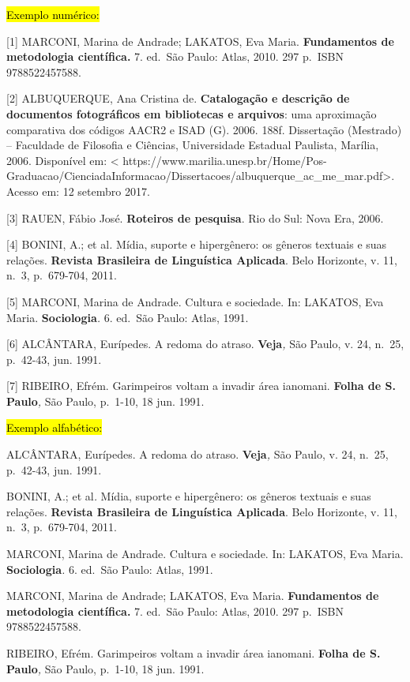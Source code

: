 \documentclass[
]{article}
\begin{document}
\hl{Exemplo numérico:}

{[}1{]} MARCONI, Marina de Andrade; LAKATOS, Eva Maria.
\textbf{Fundamentos de metodologia científica. }7. ed.~São Paulo: Atlas,
2010. 297 p.~ISBN 9788522457588.

{[}2{]} ALBUQUERQUE, Ana Cristina de. \textbf{Catalogação e descrição de
documentos fotográficos em bibliotecas e arquivos}: uma aproximação
comparativa dos códigos AACR2 e ISAD (G). 2006. 188f. Dissertação
(Mestrado) -- Faculdade de Filosofia e Ciências, Universidade Estadual
Paulista, Marília, 2006. Disponível em: \textless{}
https://www.marilia.unesp.br/Home/Pos-Graduacao/CienciadaInformacao/Dissertacoes/albuquerque\_ac\_me\_mar.pdf\textgreater.
Acesso em: 12 setembro 2017.

{[}3{]} RAUEN, Fábio José. \textbf{Roteiros de pesquisa}. Rio do Sul:
Nova Era, 2006.

{[}4{]} BONINI, A.; et al\emph{.} Mídia, suporte e hipergênero: os
gêneros textuais e suas relações. \textbf{Revista Brasileira de
Linguística Aplicada}. Belo Horizonte, v. 11, n.~3, p.~679-704, 2011.

{[}5{]} MARCONI, Marina de Andrade. Cultura e sociedade. In: LAKATOS,
Eva Maria. \textbf{Sociologia}\emph{.} 6. ed.~São Paulo: Atlas, 1991.

{[}6{]} ALCÂNTARA, Eurípedes. A redoma do atraso. \textbf{Veja}\emph{,}
São Paulo, v. 24, n.~25, p.~42-43, jun. 1991.

{[}7{]} RIBEIRO, Efrém. Garimpeiros voltam a invadir área ianomani.
\textbf{Folha de S. Paulo}\emph{,} São Paulo, p.~1-10, 18 jun. 1991.

\hl{Exemplo alfabético:}

ALCÂNTARA, Eurípedes. A redoma do atraso. \textbf{Veja}\emph{,} São
Paulo, v. 24, n.~25, p.~42-43, jun. 1991.

BONINI, A.; et al\emph{.} Mídia, suporte e hipergênero: os gêneros
textuais e suas relações. \textbf{Revista Brasileira de Linguística
Aplicada}. Belo Horizonte, v. 11, n.~3, p.~679-704, 2011.

MARCONI, Marina de Andrade. Cultura e sociedade. In: LAKATOS, Eva Maria.
\textbf{Sociologia}\emph{.} 6. ed.~São Paulo: Atlas, 1991.

MARCONI, Marina de Andrade; LAKATOS, Eva Maria. \textbf{Fundamentos de
metodologia científica. }7. ed.~São Paulo: Atlas, 2010. 297 p.~ISBN
9788522457588.

RIBEIRO, Efrém. Garimpeiros voltam a invadir área ianomani.
\textbf{Folha de S. Paulo}\emph{,} São Paulo, p.~1-10, 18 jun. 1991.
\end{document}
